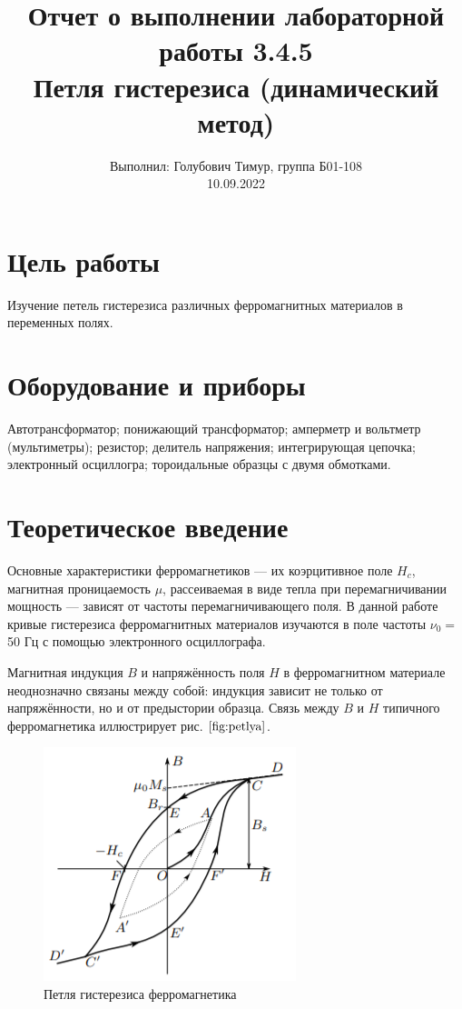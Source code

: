 \documentclass[12pt,a4paper]{article}
\author{\normalsize Выполнил: Голубович Тимур, группа Б01-108 \\
	\normalsize 10.09.2022}
\date{}
\title{
	\large Отчет о выполнении лабораторной работы 3.4.5 \\
	\Large Петля гистерезиса (динамический метод) \\ 
	
}
\begin{document}
	\maketitle
	
\section*{Цель работы}
Изучение петель гистерезиса различных ферромагнитных материалов в переменных полях.

\section*{Оборудование и приборы} 
Автотрансформатор;
понижающий трансформатор;
амперметр и вольтметр (мультиметры);
резистор;
делитель напряжения;
интегрирующая цепочка;
электронный осциллогра;
тороидальные образцы с двумя обмотками.
	
	
\section*{Теоретическое введение}

Основные характеристики
ферромагнетиков — их коэрцитивное поле $H_c$, магнитная проницаемость
$\mu$, рассеиваемая в виде тепла при перемагничивании мощность — зависят
от частоты перемагничивающего поля. В данной работе кривые гистерезиса ферромагнитных материалов изучаются в поле частоты $\nu_0 =$ 50 Гц
с помощью электронного осциллографа.

Магнитная индукция $ B $ и напряжённость поля $ H $ в ферромагнитном материале неоднозначно связаны между собой: индукция зависит
не только от напряжённости, но и от предыстории образца. Связь между $ B $ и $ H $ типичного ферромагнетика иллюстрирует рис. $\ref{fig:petlya}$.

\begin{figure}[H]
	\centering
	\includegraphics{res/petlya.png}
	\caption{Петля гистерезиса ферромагнетика}
	\label{fig:petlya}
\end{figure}
\end{document}
